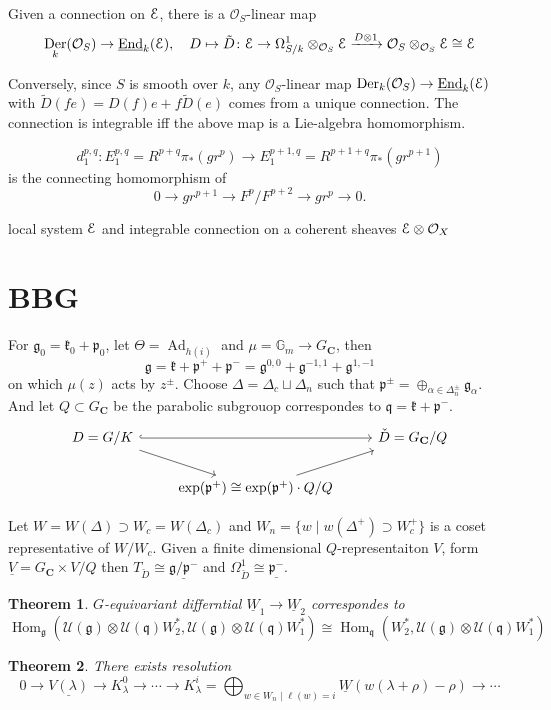 \documentclass[leqno]{amsart}
\newcommand{\EE}{\EuScript{E}}
\DeclareMathOperator{\Ad}{Ad}
\newcommand{\C}{\mathbf C}
\newcommand{\oo}{\mathcal O}
\newcommand{\1}{\mathbf{1}}
\DeclareMathOperator{\Der}{Der}
\newcommand{\rfg}{\mathfrak{g}_0}
\newcommand{\cfg}{\mathfrak{g}}
\newcommand{\rfk}{\mathfrak{k}_0}
\newcommand{\cfk}{\mathfrak{k}}
\newcommand{\rfp}{\mathfrak{p}_0}
\newcommand{\cfp}{\mathfrak{p}}
\newcommand{\cfq}{\mathfrak{q}}
\DeclareMathOperator{\End}{End}
\DeclareMathOperator{\Hom}{Hom}
\newtheorem{thm}{Theorem}[section]
\theoremstyle{definition}
\theoremstyle{remark}
\begin{document}
Given a connection on $\EE$,
there is a  $\oo_S$-linear map
 \[
	 \Der_k(\oo_S)\to \underline{\End}_k(\EE),\quad
	 D\mapsto
	 \tilde{D}\colon 
	 \EE\to \Omega_{S/k}^1\otimes_{\oo_S}\EE
	 \xrightarrow{D\otimes 1}
	 \oo_S\otimes_{\oo_S}\EE\cong \EE
\]

Conversely, since $S$ is smooth over  $k$,
any  $\oo_S$-linear map
$\Der_k(\oo_S)\to \underline{\End}_k(\EE)$
with  $ \tilde{D}(fe)=D(f)e+f\tilde{D}(e)$
comes from a unique connection.
The connection is integrable iff
the above map is a Lie-algebra homomorphism.

 \[
	 d_1^{p,q}\colon E_1^{p,q}=R^{p+q}\pi_*(gr^p)\to 
	 E_1^{p+1,q}=R^{p+1+q}\pi_*(gr^{p+1})
\]
is the connecting homomorphism of 
\[
	0\to gr^{p+1}\to F^p/F^{p+2}\to gr^p\to 0.
\]

local system $\EE$ and 
integrable connection on a coherent sheaves $\EE\otimes\oo_X$

\section{BBG}
For  $\rfg=\rfk+\rfp$,
let  $\Theta=\Ad_{h(i)}$
and $\mu=\mathbb{G}_m\to G_\C$,
then
 \[
	\cfg=\cfk+\cfp^++\cfp^-=
	\cfg^{0,0}+
	\cfg^{-1,1}+
	\cfg^{1,-1}
\]
on which $\mu(z)$ acts by  $z^{\pm}$.
Choose $\Delta=\Delta_c\sqcup \Delta_n$
such that  $\cfp^\pm=\oplus_{\alpha\in \Delta_n^\pm}\cfg_\alpha$.
And let $Q\subset G_\C$
be the parabolic subgrouop correspondes
to  $\cfq=\cfk+\cfp^-$.
 \[
	 \begin{tikzcd}
		 D=G/K\arrow[rr,hookrightarrow]
		 \arrow[dr]
		 && \check{D}=G_\C/Q\\
		 &
		 \exp(\cfp^+)\cong
		 \exp(\cfp^+)\cdot Q/Q\arrow[ur]&
	 \end{tikzcd}
\]

Let $W=W(\Delta)\supset W_c=W(\Delta_c)$
and  $W_n=\{w\mid w(\Delta^+)\supset W^+_c\}$ 
is a coset representative of $W/W_c$.
Given a finite dimensional
$Q$-representaiton  $V$,
form  $\underline{V}=G_\C\times V/Q$
then
$T_{\check{D}}\cong \underline{\cfg/\cfp^-}$
and $\Omega^1_{\check{D}}\cong \underline{\cfp^-}$.
\begin{thm}
	$G$-equivariant differntial
	$\underline{W}_1\to
	\underline{W}_2$ 
	correspondes
	to 
	\[
		\Hom_\cfg(
		\mathcal{U}(\cfg)\otimes
		\mathcal{U}(\cfq)W_2^*,
		\mathcal{U}(\cfg)\otimes
		\mathcal{U}(\cfq)W_1^*)
		\cong 
		\Hom_\cfq( W_2^*,
		\mathcal{U}(\cfg)\otimes
		\mathcal{U}(\cfq)W_1^*)
	\]
\end{thm}
\begin{thm}
	There exists resolution
	\[
		0\to
		\underline{V(\lambda)}\to
		K^0_\lambda\to\cdots\to
		K^i_\lambda=\bigoplus_{
		w\in W_n\mid \ell(w)=i}
		\underline{W}(w(\lambda+\rho)-\rho)\to \cdots
	\]
\end{thm}
\end{document}
